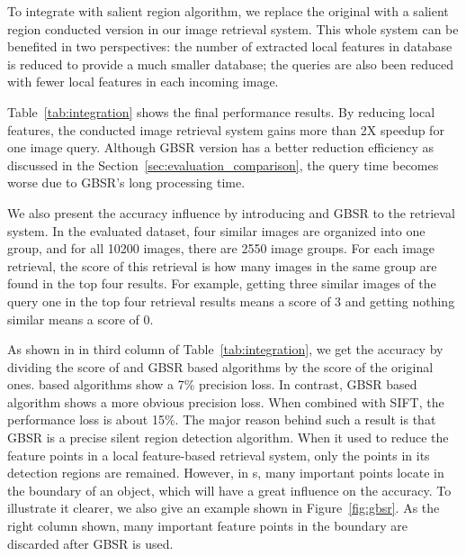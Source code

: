 To integrate with salient region algorithm, we replace the original {\lfea} with a salient region conducted version in our image retrieval system. This whole system can be benefited in two perspectives: the number of extracted local features in database is reduced to provide a much smaller database; the queries are also been reduced with fewer local features in each incoming image.

Table~\ref{tab:integration} shows the final performance results. By reducing local features, the {\sys} conducted image retrieval system gains more than 2X speedup for one image query. Although GBSR version has a better reduction efficiency as discussed in the Section~\ref{sec:evaluation_comparison}, the query time becomes worse due to GBSR's long processing time.

We also present the accuracy influence by introducing {\sys} and GBSR to the retrieval system. In the evaluated dataset, four similar images are organized into one group, and for all 10200 images, there are 2550 image groups. For each image retrieval, the score of this retrieval is how many images in the same group are found in the top four results. For example, getting three similar images of the query one in the top four retrieval results means a score of 3 and getting nothing similar means a score of 0.

As shown in in third column of Table~\ref{tab:integration}, we get the accuracy by dividing the score of {\sys} and GBSR based algorithms by the score of the original ones. {\sys} based algorithms show a 7\% precision loss. In contrast, GBSR based algorithm shows a more obvious precision loss. When combined with SIFT, the performance loss is about 15\%. The major reason behind such a result is that GBSR is a precise silent region detection algorithm. When it used to reduce the feature points in a local feature-based retrieval system, only the points in its detection regions are remained. However, in {\lfea}s, many important points locate in the boundary of an object, which will have a great influence on the accuracy. To illustrate it clearer, we also give an example shown in Figure~\ref{fig:gbsr}. As the right column shown, many important feature points in the boundary are discarded after GBSR is used. 

